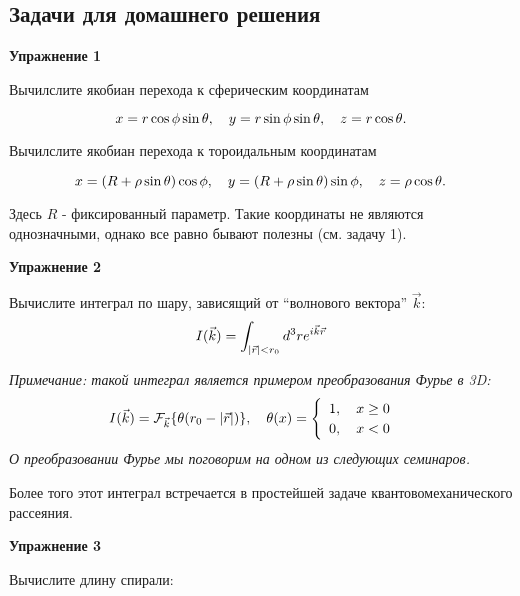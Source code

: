 \documentclass[a4paper,12pt]{article}
\begin{document}
\subsection*{Задачи для домашнего решения}

\noindent \textbf{Упражнение 1}

\noindent Вычилслите якобиан перехода к сферическим координатам

\begin{equation}\notag
x=r\cos\phi\sin\theta,\quad y=r\sin\phi\sin\theta,\quad z=r\cos\theta.
\end{equation}

\noindent Вычилслите якобиан перехода к тороидальным координатам

\begin{equation}\notag
x=(R+\rho\sin\theta)\cos\phi,\quad y=(R+\rho\sin\theta)\sin\phi,\quad z=\rho\cos\theta.	
\end{equation}

\noindent Здесь $R$ - фиксированный параметр. Такие координаты не являются однозначными, однако все равно бывают полезны (см. задачу 1).

\vspace{15pt}
\noindent \textbf{Упражнение 2}

\noindent Вычислите интеграл по шару, зависящий от “волнового вектора” $\vec{k}$:
\begin{equation}\notag
I(\vec{k})=\int_{|\vec{r}|<r_{0}}d^{3}re^{i\vec{k}\vec{r}}	
\end{equation}

\noindent \textit{Примечание: такой интеграл является примером преобразования Фурье в 3D:}
\begin{equation}\notag
I(\vec{k})	=\mathcal{F}_{\vec{k}}\{\theta(r_{0}-|\vec{r}|)\},\quad\theta(x)=\begin{cases}
\begin{array}{c}
1,\quad x\geq0\\
0,\quad x<0
\end{array}\end{cases}
\end{equation}
\noindent \textit{О преобразовании Фурье мы поговорим на одном из следующих семинаров.}

\noindent Более того этот интеграл встречается в простейшей задаче квантовомеханического рассеяния.

\vspace{15pt}
\noindent \textbf{Упражнение 3}

\noindent Вычислите длину спирали:
\end{document}
